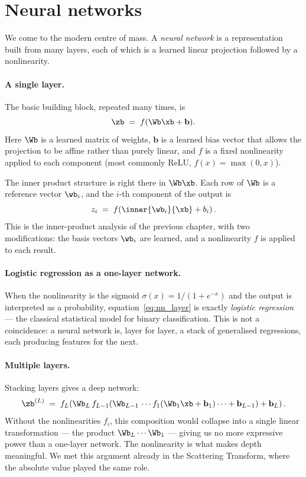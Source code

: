 \section{Neural networks}
\label{sec:nn}

We come to the modern centre of mass.  A \emph{neural network} is a
representation built from many layers, each of which is a learned
linear projection followed by a nonlinearity.

\paragraph{A single layer.}  The basic building block, repeated many
times, is
\begin{equation}
    \zb \;=\; f(\Wb \xb + \mathbf{b}).
    \label{eq:nn_layer}
\end{equation}
Here $\Wb$ is a learned matrix of weights, $\mathbf{b}$ is a learned
bias vector that allows the projection to be affine rather than purely
linear, and $f$ is a fixed nonlinearity applied to each component (most
commonly ReLU, $f(x) = \max(0, x)$).

The inner product structure is right there in $\Wb \xb$.  Each row of
$\Wb$ is a reference vector $\wb_i$, and the $i$-th component of the
output is
\begin{equation}
    z_i \;=\; f\!\left( \inner{\wb_i}{\xb} + b_i \right).
\end{equation}
This is the inner-product analysis of the previous chapter, with two
modifications: the basis vectors $\wb_i$ are learned, and a nonlinearity
$f$ is applied to each result.

\paragraph{Logistic regression as a one-layer network.}  When the
nonlinearity is the sigmoid $\sigma(x) = 1 / (1 + e^{-x})$ and the
output is interpreted as a probability, equation~\eqref{eq:nn_layer} is
exactly \emph{logistic regression} --- the classical statistical model
for binary classification.  This is not a coincidence: a neural network
is, layer for layer, a stack of generalised regressions, each producing
features for the next.

\paragraph{Multiple layers.}  Stacking layers gives a deep network:
\begin{equation}
    \zb^{(L)} \;=\; f_L\!\left( \Wb_L \, f_{L-1}\!\left( \Wb_{L-1}\,
    \cdots f_1\!\left( \Wb_1 \xb + \mathbf{b}_1 \right) \cdots
    + \mathbf{b}_{L-1} \right) + \mathbf{b}_L \right).
    \label{eq:nn_deep}
\end{equation}
Without the nonlinearities $f_i$, this composition would collapse into
a single linear transformation --- the product $\Wb_L \cdots \Wb_1$ ---
giving us no more expressive power than a one-layer network.  The
nonlinearity is what makes depth meaningful.  We met this argument
already in the Scattering Transform, where the absolute value played
the same role.

